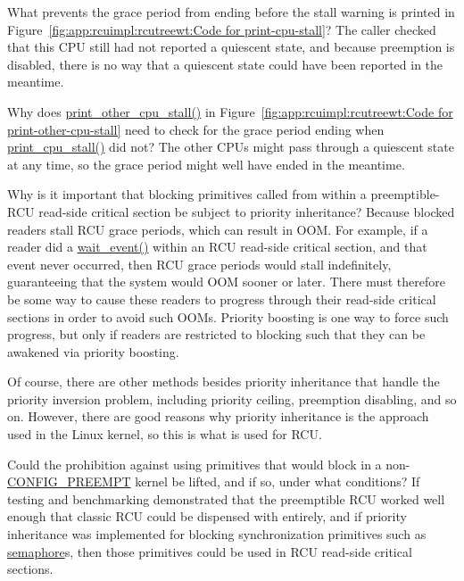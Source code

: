 \QuickQ{}
	What prevents the grace period from ending before the
	stall warning is printed in
	Figure~\ref{fig:app:rcuimpl:rcutreewt:Code for print-cpu-stall}?
\QuickA{}
	The caller checked that this CPU still had not reported a
	quiescent state, and because preemption is disabled, there is
	no way that a quiescent state could have been reported in
	the meantime.

\QuickQ{}
	Why does \url{print_other_cpu_stall()} in
	Figure~\ref{fig:app:rcuimpl:rcutreewt:Code for print-other-cpu-stall}
	need to check for the grace period ending when
	\url{print_cpu_stall()} did not?
\QuickA{}
	The other CPUs might pass through a quiescent state at any time,
	so the grace period might well have ended in the meantime.

\QuickQ{}
	Why is it important that blocking primitives
	called from within a preemptible-RCU read-side critical section be
	subject to priority inheritance?
\QuickA{}
	Because blocked readers stall RCU grace periods,
	which can result in OOM.
	For example, if a reader did a \url{wait_event()} within
	an RCU read-side critical section, and that event never occurred,
	then RCU grace periods would stall indefinitely, guaranteeing that
	the system would OOM sooner or later.
	There must therefore be some way to cause these readers to progress
	through their read-side critical sections in order to avoid such OOMs.
	Priority boosting is one way to force such progress, but only if
	readers are restricted to blocking such that they can be awakened via
	priority boosting.

	Of course, there are other methods besides priority inheritance
	that handle the priority inversion problem, including priority ceiling,
	preemption disabling, and so on.
	However, there are good reasons why priority inheritance is the approach
	used in the Linux kernel, so this is what is used for RCU.

\QuickQ{}
	Could the prohibition against using primitives
	that would block in a non-\url{CONFIG_PREEMPT} kernel be lifted,
	and if so, under what conditions?
\QuickA{}
	If testing and benchmarking demonstrated that the
	preemptible RCU worked well enough that classic RCU could be dispensed
	with entirely, and if priority inheritance was implemented for blocking
	synchronization primitives
	such as \url{semaphore}s, then those primitives could be
	used in RCU read-side critical sections.

